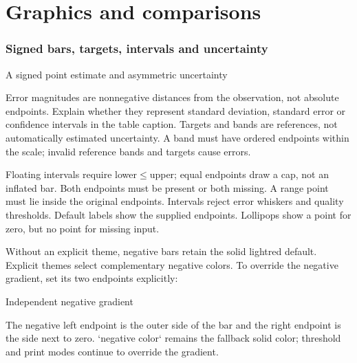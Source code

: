 \part{Graphics and comparisons}

\section{Signed bars, targets, intervals and uncertainty}
\begin{demo}{A signed point estimate and asymmetric uncertainty}


\end{demo}
Error magnitudes are nonnegative distances from the observation, not absolute
endpoints. Explain whether they represent standard deviation, standard error or
confidence intervals in the table caption. Targets and bands are references, not
automatically estimated uncertainty. A band must have ordered endpoints within
the scale; invalid reference bands and targets cause errors.

Floating intervals require lower$\le$upper; equal endpoints draw a cap, not an
inflated bar. Both endpoints must be present or both missing. A range point must
lie inside the original endpoints. Intervals reject error whiskers and quality
thresholds. Default labels show the supplied endpoints.
Lollipops show a point for zero, but no point for missing input.

Without an explicit theme, negative bars retain the solid lightred default.
Explicit themes select complementary negative colors. To override the negative gradient,
set its two endpoints explicitly:
\begin{demo}{Independent negative gradient}
\end{demo}
The negative left endpoint is the outer side of the bar and the right endpoint is
the side next to zero. `negative color` remains the fallback solid color; threshold
and print modes continue to override the gradient.


